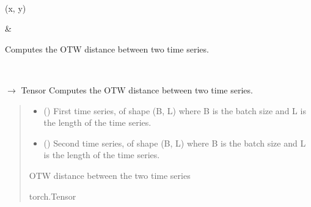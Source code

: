 \documentclass[letterpaper,10pt,english]{sphinxmanual}
\begin{document}
\begin{fulllineitems}
\begin{savenotes}
\begin{longtable}{}
\sphinxbottomrule
{}\\
\endfoot

\endlastfoot
\sphinxtableatstartofbodyhook
\begin{varwidth}[t]{}
\sphinxAtStartPar
{\hyperref[\detokenize{dtw_loss_functions.otw:dtw_loss_functions.otw.otw.forward}]{}}(x, y)
\sphinxbeforeendvarwidth
\end{varwidth}%
&\begin{varwidth}[t]{}
\sphinxAtStartPar
Computes the OTW distance between two time series.
\sphinxbeforeendvarwidth
\end{varwidth}%
\\
\sphinxbottomrule
\end{longtable}
\sphinxtableafterendhook
\sphinxatlongtableend
\end{savenotes}

\begin{fulllineitems}
\label{\detokenize{dtw_loss_functions.otw:dtw_loss_functions.otw.otw.forward}}
\pysigstartsignatures
\pysiglinewithargsret
{}
{\sphinxparamcomma {}}
{{ $\rightarrow$ Tensor}}
\pysigstopsignatures
\sphinxAtStartPar
Computes the OTW distance between two time series.
\begin{quote}\begin{description}
\begin{itemize}
\item {} 
\sphinxAtStartPar
{} () \textendash{} First time series, of shape (B, L) where B is the batch size and L is the length of the time series.

\item {} 
\sphinxAtStartPar
{} () \textendash{} Second time series, of shape (B, L) where B is the batch size and L is the length of the time series.

\end{itemize}

\sphinxAtStartPar
OTW distance between the two time series

\sphinxAtStartPar
torch.Tensor

\end{description}\end{quote}

\end{fulllineitems}


\end{fulllineitems}
\end{document}
